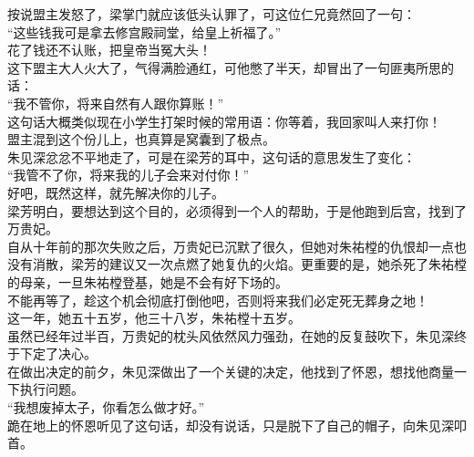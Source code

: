 \begin{multicols}{\theparacolNo}
按说盟主发怒了，梁掌门就应该低头认罪了，可这位仁兄竟然回了一句：\\

“这些钱我可是拿去修宫殿祠堂，给皇上祈福了。”\\

花了钱还不认账，把皇帝当冤大头！\\

这下盟主大人火大了，气得满脸通红，可他憋了半天，却冒出了一句匪夷所思的话：\\

“我不管你，将来自然有人跟你算账！”\\

这句话大概类似现在小学生打架时候的常用语：你等着，我回家叫人来打你！\\

盟主混到这个份儿上，也真算是窝囊到了极点。\\

朱见深忿忿不平地走了，可是在梁芳的耳中，这句话的意思发生了变化：\\

“我管不了你，将来我的儿子会来对付你！”\\

好吧，既然这样，就先解决你的儿子。\\

梁芳明白，要想达到这个目的，必须得到一个人的帮助，于是他跑到后宫，找到了万贵妃。\\

自从十年前的那次失败之后，万贵妃已沉默了很久，但她对朱祐樘的仇恨却一点也没有消散，梁芳的建议又一次点燃了她复仇的火焰。更重要的是，她杀死了朱祐樘的母亲，一旦朱祐樘登基，她是不会有好下场的。\\

不能再等了，趁这个机会彻底打倒他吧，否则将来我们必定死无葬身之地！\\

这一年，她五十五岁，他三十八岁，朱祐樘十五岁。\\

虽然已经年过半百，万贵妃的枕头风依然风力强劲，在她的反复鼓吹下，朱见深终于下定了决心。\\

在做出决定的前夕，朱见深做出了一个关键的决定，他找到了怀恩，想找他商量一下执行问题。\\

“我想废掉太子，你看怎么做才好。”\\

跪在地上的怀恩听见了这句话，却没有说话，只是脱下了自己的帽子，向朱见深叩首。\\


\end{multicols}

